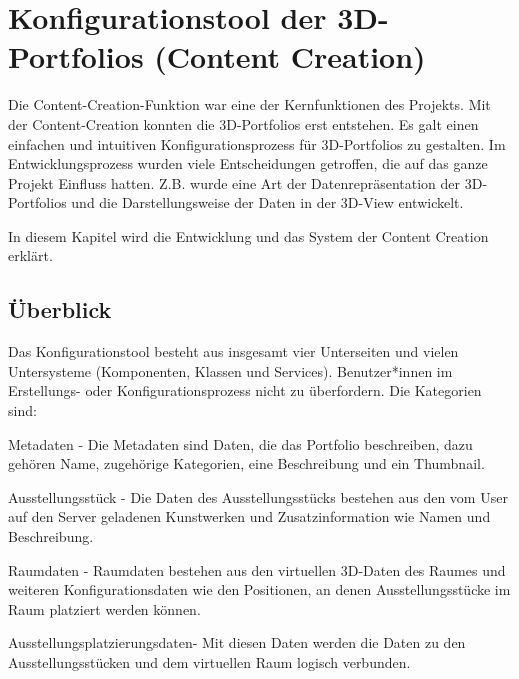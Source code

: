 \section{Konfigurationstool der 3D-Portfolios (Content Creation)}

Die Content-Creation-Funktion war eine der Kernfunktionen des Projekts. Mit der Content-Creation konnten die 3D-Portfolios erst entstehen. Es galt einen einfachen und intuitiven Konfigurationsprozess für 3D-Portfolios zu gestalten. Im Entwicklungsprozess wurden viele Entscheidungen getroffen, die auf das ganze Projekt Einfluss hatten. Z.B. wurde eine Art der Datenrepräsentation der 3D-Portfolios und die Darstellungsweise der Daten in der 3D-View entwickelt.

In diesem Kapitel wird die Entwicklung und das System der Content Creation erklärt.

\subsection{Überblick}
Das Konfigurationstool besteht aus insgesamt vier Unterseiten und vielen Untersysteme (Komponenten, Klassen und Services). Benutzer*innen im Erstellungs- oder Konfigurationsprozess nicht zu überfordern. Die Kategorien sind:
\begin{compactitem}
\item Metadaten - Die Metadaten sind Daten, die das Portfolio beschreiben, dazu gehören Name, zugehörige Kategorien, eine Beschreibung und ein Thumbnail.
\item Ausstellungsstück - Die Daten des Ausstellungsstücks bestehen aus den vom User auf den Server geladenen Kunstwerken und Zusatzinformation wie Namen und Beschreibung.
\item Raumdaten - Raumdaten bestehen aus den virtuellen 3D-Daten des Raumes und weiteren Konfigurationsdaten wie den Positionen, an denen Ausstellungsstücke im Raum platziert werden können.
\item Ausstellungsplatzierungsdaten- Mit diesen Daten werden die Daten zu den Ausstellungsstücken und dem virtuellen Raum logisch verbunden. 
\end{compactitem}
